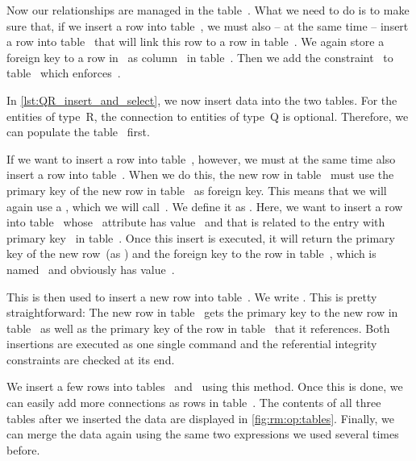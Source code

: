 Now our relationships are managed in the table~.
What we need to do is to make sure that, if we insert a row into table~, we must also -- at the same time -- insert a row into table~ that will link this row to a row in table~.
We again store a  foreign key to a row in~ as column~ in table~.
Then we add the constraint~ to table~ which enforces~.

In \cref{lst:QR_insert_and_select}, we now insert data into the two tables.
For the entities of type~R, the connection to entities of type~Q is optional.
Therefore, we can populate the table~ first.

If we want to insert a row into table~, however, we must at the same time also insert a row into table~.
When we do this, the new row in table~ must use the primary key of the new row in table~ as foreign key.
This means that we will again use a , which we will call~.
We define it as .
Here, we want to insert a row into table~ whose ~attribute has value~ and that is related to the entry with primary key~ in table~.
Once this insert is executed, it will return the primary key of the new row~(as ) and the foreign key to the row in table~, which is named~ and obviously has value~.%
%
\begin{sloppypar}%
This  is then used to insert a new row into table~.
We write .
This is pretty straightforward:
The new row in table~ gets the primary key to the new row in table~ as well as the primary key of the row in table~ that it references.
Both insertions are executed as one single command and the referential integrity constraints are checked at its end.%
\end{sloppypar}%
%
We insert a few rows into tables~ and~ using this method.
Once this is done, we can easily add more connections as rows in table~.
The contents of all three tables after we inserted the data are displayed in \cref{fig:rm:op:tables}.
Finally, we can merge the data again using the same two  expressions we used several times before.

